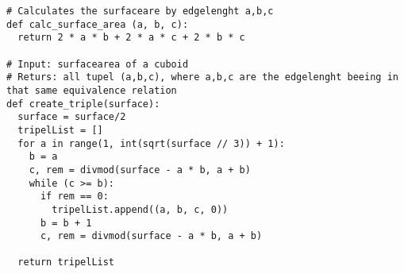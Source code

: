 \begin{lstlisting}[caption=Generierung von Schachteln]
# Calculates the surfaceare by edgelenght a,b,c
def calc_surface_area (a, b, c):
  return 2 * a * b + 2 * a * c + 2 * b * c

# Input: surfacearea of a cuboid
# Returs: all tupel (a,b,c), where a,b,c are the edgelenght beeing in that same equivalence relation
def create_triple(surface):
  surface = surface/2
  tripelList = []
  for a in range(1, int(sqrt(surface // 3)) + 1):
    b = a
    c, rem = divmod(surface - a * b, a + b)
    while (c >= b):
      if rem == 0:
        tripelList.append((a, b, c, 0)) 
      b = b + 1
      c, rem = divmod(surface - a * b, a + b)
  
  return tripelList
\end{lstlisting}